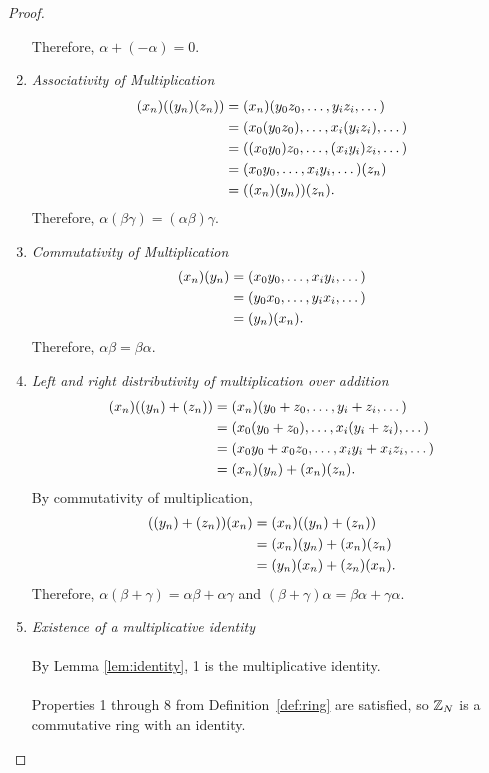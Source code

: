 \begin{proof}
\begin{enumerate}
      Therefore, $\alpha+(-\alpha)=0$.
    \item {\em Associativity of Multiplication}
      \begin{align*}
        (x_n)((y_n)(z_n))&=(x_n)(y_0z_0,\dots,y_iz_i,\dots) \\
                   &=(x_0(y_0z_0),\dots,x_i(y_iz_i),\dots) \\
                   &=((x_0y_0)z_0,\dots,(x_iy_i)z_i,\dots) \\
                   &=(x_0y_0,\dots,x_iy_i,\dots)(z_n) \\
                   &=((x_n)(y_n))(z_n).
      \end{align*}
      Therefore, $\alpha(\beta\gamma)=(\alpha\beta)\gamma$.
    \setcounter{enumi}{6}
    \item {\em Commutativity of Multiplication}
      \begin{align*}
        (x_n)(y_n)&=(x_0y_0,\dots,x_iy_i,\dots) \\
              &=(y_0x_0,\dots,y_ix_i,\dots) \\
              &=(y_n)(x_n).
      \end{align*}
      Therefore, $\alpha\beta=\beta\alpha$.
    \setcounter{enumi}{5}
    \item {\em Left and right distributivity of multiplication over addition}
      \begin{align*}
        (x_n)((y_n)+(z_n))&=(x_n)(y_0+z_0,\dots,y_i+z_i,\dots) \\
                    &=(x_0(y_0+z_0),\dots,x_i(y_i+z_i),\dots) \\
                    &=(x_0y_0+x_0z_0,\dots,x_iy_i+x_iz_i,\dots) \\
                    &=(x_n)(y_n)+(x_n)(z_n). \\
      \end{align*}
      By commutativity of multiplication,
      \begin{align*}
        ((y_n)+(z_n))(x_n)&=(x_n)((y_n)+(z_n))\\
                    &=(x_n)(y_n)+(x_n)(z_n)\\
                    &=(y_n)(x_n)+(z_n)(x_n).
      \end{align*}
      Therefore, $\alpha(\beta+\gamma)=\alpha\beta+\alpha\gamma$ and
      $(\beta+\gamma)\alpha=\beta\alpha+\gamma\alpha$.
    \setcounter{enumi}{7}
    \item {\em Existence of a multiplicative identity}
      \\ \\
      By Lemma \ref{lem:identity}, 1 is the multiplicative identity.
      \\ \\
      Properties 1 through 8 from Definition~\ref{def:ring} are satisfied,
      so $\mathbb{Z}_N$ is a commutative ring with an identity.
  \end{enumerate}
\end{proof}

